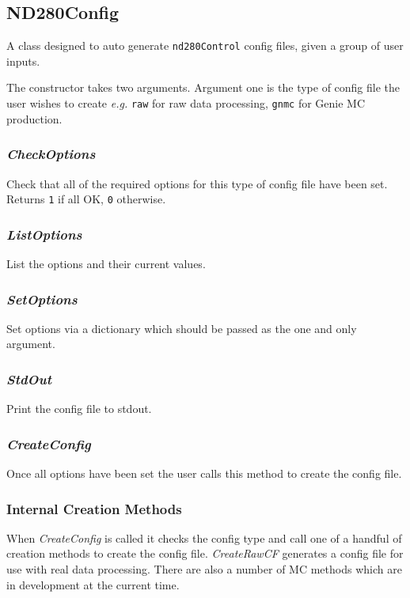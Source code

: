 \documentclass[11pt]{article}
\begin{document}
\subsection{ND280Config}
A class designed to auto generate \verb+nd280Control+ config files, given a
group of user inputs.

The constructor takes two arguments. Argument one is the type of
config file the user wishes to create \textit{e.g.} \verb'raw' for raw data
processing, \verb'gnmc' for Genie MC production.

\subsubsection*{\textit{CheckOptions}}
Check that all of the required options for this type of config file
have been set. Returns \verb+1+ if all OK, \verb+0+ otherwise.

\subsubsection*{\textit{ListOptions}}
List the options and their current values.

\subsubsection*{\textit{SetOptions}}
Set options via a dictionary which should be passed as the one and
only argument.

\subsubsection*{\textit{StdOut}} 
Print the config file to stdout.

\subsubsection*{\textit{CreateConfig}}
Once all options have been set the user calls this method to create
the config file.

\subsubsection*{Internal Creation Methods}
When \textit{CreateConfig} is called it checks the config type and
call one of a handful of creation methods to create the config file.
\textit{CreateRawCF} generates a config file for use with real data
processing. There are also a number of MC methods which are in
development at the current time.
\end{document}
